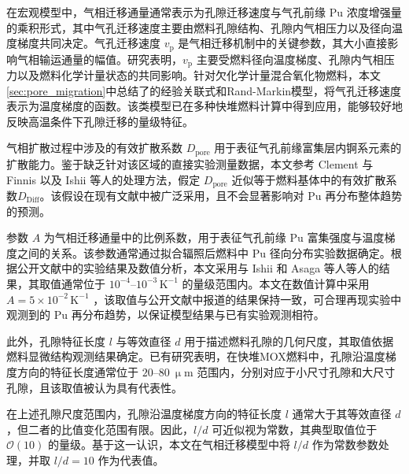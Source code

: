 在宏观模型中，气相迁移通量通常表示为孔隙迁移速度与气孔前缘 Pu 浓度增强量的乘积形式，其中气孔迁移速度主要由燃料孔隙结构、孔隙内气相压力以及径向温度梯度共同决定。气孔迁移速度 $v_{\mathrm p}$ 是气相迁移机制中的关键参数，其大小直接影响气相输运通量的幅值。研究表明，$v_{\mathrm p}$ 主要受燃料径向温度梯度、孔隙内气相压力以及燃料化学计量状态的共同影响。针对欠化学计量混合氧化物燃料，本文\ref{sec:pore_migration}中总结了的经验关联式和Rand\--Markin模型，将气孔迁移速度表示为温度梯度的函数。该类模型已在多种快堆燃料计算中得到应用，能够较好地反映高温条件下孔隙迁移的量级特征。

气相扩散过程中涉及的有效扩散系数 $D_{\mathrm{pore}}$ 用于表征气孔前缘富集层内锕系元素的扩散能力。鉴于缺乏针对该区域的直接实验测量数据，本文参考 Clement 与 Finnis\cite{clementPlutoniumRedistributionMixed1978} 以及 Ishii\cite{ishiiInvestigationPuMigration2001} 等人的处理方法，假定 $D_{\mathrm{pore}}$ 近似等于燃料基体中的有效扩散系数$D_{\mathrm{Diff}}$。该假设在现有文献中\cite{clementPlutoniumRedistributionMixed1978,ishiiInvestigationPuMigration2001}被广泛采用，且不会显著影响对 Pu 再分布整体趋势的预测。

参数 $A$ 为气相迁移通量中的比例系数，用于表征气孔前缘 Pu 富集强度与温度梯度之间的关系。该参数通常通过拟合辐照后燃料中 Pu 径向分布实验数据确定。根据公开文献中的实验结果及数值分析，本文采用与 Ishii 和 Asaga 等人\cite{ishiiInvestigationPuMigration2001,dimarcelloModellingActinideRedistribution2014}等人的结果，其取值通常位于 $10^{-4}$--$10^{-3}\,\mathrm{K^{-1}}$ 的量级范围内。本文在数值计算中采用 $A = 5\times10^{-2}\,\mathrm{K^{-1}}$ \cite{clementPlutoniumRedistributionMixed1978,ishiiInvestigationPuMigration2001,dimarcelloModellingActinideRedistribution2014}，该取值与公开文献\cite{dimarcelloModellingActinideRedistribution2014}中报道的结果保持一致，可合理再现实验中观测到的 Pu 再分布趋势，以保证模型结果与已有实验观测相符。

此外，孔隙特征长度 $l$ 与等效直径 $d$ 用于描述燃料孔隙的几何尺度，其取值依据燃料显微结构观测结果确定。已有研究表明，在快堆MOX燃料中，孔隙沿温度梯度方向的特征长度通常位于 $20$--$80~\upmu\mathrm{m}$ 范围内，分别对应于小尺寸孔隙和大尺寸孔隙，且该取值被认为具有代表性\cite{clementPlutoniumRedistributionMixed1978, hoffmannCrackFormationCrack1974}。

在上述孔隙尺度范围内，孔隙沿温度梯度方向的特征长度 $l$ 通常大于其等效直径 $d$，但二者的比值变化范围有限。因此，$l/d$ 可近似视为常数，其典型取值位于 $\mathcal{O}(10)$ 的量级\cite{clementPlutoniumRedistributionMixed1978}。基于这一认识，本文在气相迁移模型中将 $l/d$ 作为常数参数处理，并取 $l/d = 10$ 作为代表值。

